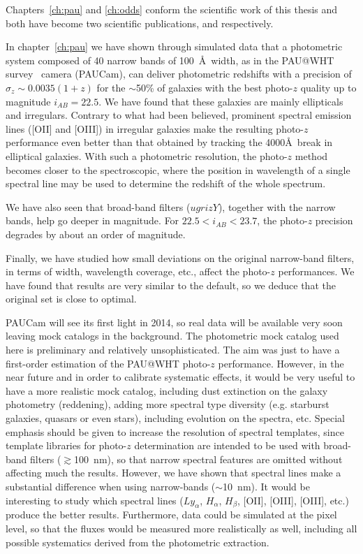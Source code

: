 Chapters~\ref{ch:pau} and \ref{ch:odds} conform the scientific work of this thesis and both have become two scientific publications, \citet{Marti2014b} and \citet{Marti2014a} respectively. 

In chapter~\ref{ch:pau} we have shown through simulated data that a photometric system composed of 40 narrow bands of 100~\AA \ width, as in the PAU@WHT survey~\citep{Benitez2009} camera (PAUCam), can deliver photometric redshifts with a precision of $\sigma_z \sim 0.0035(1+z)$ for the $\sim$50\% of galaxies with the best photo-$z$ quality up to magnitude $i_{AB}=22.5$. We have found that these galaxies are mainly ellipticals and irregulars. Contrary to what had been believed, prominent spectral emission lines ([OII] and [OIII]) in irregular galaxies make the resulting photo-$z$ performance even better than that obtained by tracking the 4000\AA \ break in elliptical galaxies. With such a photometric resolution, the photo-$z$ method becomes closer to the spectroscopic, where the position in wavelength of a single spectral line may be used to determine the redshift of the whole spectrum. 

We have also seen that broad-band filters ($ugrizY$), together with the narrow bands, help go deeper in magnitude. For $22.5<i_{AB}<23.7$, the photo-$z$ precision degrades by about an order of magnitude. 

Finally, we have studied how small deviations on the original narrow-band filters, in terms of width, wavelength coverage, etc., affect the photo-$z$ performances. We have found that results are very similar to the default, so we deduce that the original set is close to optimal.

PAUCam will see its first light in 2014, so real data will be available very soon leaving mock catalogs in the background. The photometric mock catalog used here is preliminary and relatively unsophisticated. The aim was just to have a first-order estimation of the PAU@WHT photo-$z$ performance. However, in the near future and in order to calibrate systematic effects, it would be very useful to have a more realistic mock catalog, including dust extinction on the galaxy photometry (reddening), adding more spectral type diversity (e.g. starburst galaxies, quasars or even stars), including evolution on the spectra, etc. Special emphasis should be given to increase the resolution of spectral templates, since template libraries for photo-$z$ determination \citep[e.g.][]{Coleman1980,Kinney1996} are intended to be used with broad-band filters ($\gtrsim$100~nm), so that narrow spectral features are omitted without affecting much the results. However, we have shown that spectral lines make a substantial difference when using narrow-bands ($\sim$10~nm). It would be interesting to study which spectral lines ($Ly_\alpha$, $H_\alpha$, $H_\beta$, [OII], [OIII], [OIII], etc.)
produce the better results. Furthermore, data could be simulated at the pixel level, so that the fluxes would be measured more realistically as well, including all possible systematics derived from the photometric extraction. 

